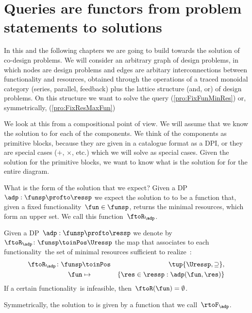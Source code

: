 \section{Queries are functors from problem statements to solutions}

In this and the following chapters we are going to build towards the solution of co-design problems.
We will consider an arbitrary graph of design problems, in which nodes are design problems and edges are arbitary interconnections between functionality and resources, obtained through the operations of a traced monoidal category (series, parallel, feedback) plus the lattice structure (and, or) of design problems. On this structure we want to solve the query \FixFunMinRes (\cref{pro:FixFunMinRes}) or, symmetrically, \FixResMaxFun (\cref{pro:FixResMaxFun})


We look at this from a compositional point of view. We will assume that we know the solution to \FixFunMinRes for each of the components. We think of the components as primitive blocks, because they are given in a catalogue format as a DPI, or they are special cases ($+$, $\times$, etc.) which we will solve as special cases.  Given the solution for the primitive blocks, we want to know what is the solution for \FixFunMinRes for the entire diagram.

What is the form of the solution that we expect? Given a DP $\adp: \funsp \profto \ressp$ we expect the solution to \FixFunMinRes to be a function that, given a fixed functionality~$\fun\in\funsp$, returns the minimal resources, which form an upper set. We call this function~$\ftoR_\adp$.

\begin{definition}
  \label{def:ftoR-dp}
  Given a DP~$\adp:\funsp\profto\ressp$
  we denote by~$\ftoR_{\adp}\colon \funsp\toinPos\Uressp$ the map that associates
  to each functionality~\fun the set of minimal resources sufficient to realize~\fun:
  \begin{eqnarray*}
    \ftoR_{\adp}\colon \funsp & \toinPos & \tup{\Uressp, \supseteq},\\
    \fun& \mapsto & \{ \res \in \ressp : \adp(\fun, \res)\}
  \end{eqnarray*}
  If a certain functionality~\fun is infeasible, then~$\ftoR(\fun)=\emptyset$.
\end{definition}


Symmetrically, the solution to \FixResMaxFun is given by a function that we call~$\rtoF_\adp$.


